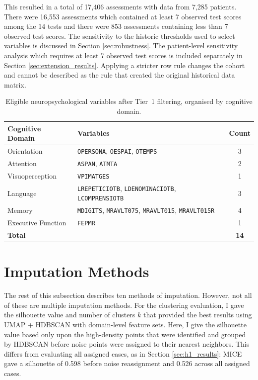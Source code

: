 This resulted in a total of 17,406 assessments with data from 7,285 patients. There were 16,553 assessments which contained at least 7 observed test scores among the 14 tests and there were 853 assessments containing less than 7 observed test scores. The sensitivity to the historic thresholds used to select variables is discussed in Section \ref{sec:robustness}. The patient-level sensitivity analysis which requires at least 7 observed test scores is included separately in Section \ref{sec:extension_results}. Applying a stricter row rule changes the cohort and cannot be described as the rule that created the original historical data matrix.

\begin{table}[ht]
\caption{Eligible neuropsychological variables after Tier~1 filtering, organised by cognitive domain.}
\label{tab:eligible_vars}
\centering
\small
\begin{tabular}{l p{} c}
\toprule
\textbf{Cognitive Domain} & \textbf{Variables} & \textbf{Count} \\
\midrule
Orientation        & \texttt{OPERSONA}, \texttt{OESPAI}, \texttt{OTEMPS} & 3 \\
Attention          & \texttt{ASPAN}, \texttt{ATMTA} & 2 \\
Visuoperception    & \texttt{VPIMATGES} & 1 \\
Language           & \texttt{LREPETICIOTB}, \texttt{LDENOMINACIOTB}, \texttt{LCOMPRENSIOTB} & 3 \\
Memory             & \texttt{MDIGITS}, \texttt{MRAVLT075}, \texttt{MRAVLT015}, \texttt{MRAVLT015R} & 4 \\
Executive Function & \texttt{FEPMR} & 1 \\
\midrule
\textbf{Total}     & & \textbf{14} \\
\bottomrule
\end{tabular}
\end{table}

\section{Imputation Methods}\label{sec:imputation}

The rest of this subsection describes ten methods of imputation. However, not all of these are multiple imputation methods. For the clustering evaluation, I gave the silhouette value and number of clusters \(k\) that provided the best results using UMAP + HDBSCAN with domain-level feature sets. Here, I give the silhouette value based only upon the high-density points that were identified and grouped by HDBSCAN before noise points were assigned to their nearest neighbors. This differs from evaluating all assigned cases, as in Section \ref{sec:h1_results}: MICE gave a silhouette of 0.598 before noise reassignment and 0.526 across all assigned cases.

